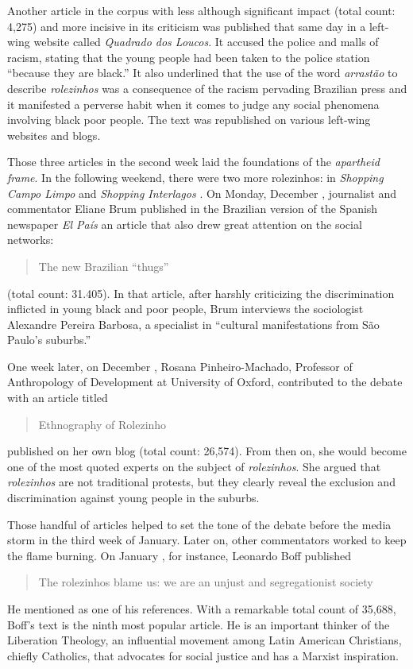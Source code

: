 Another article in the corpus \autocite{quadrado_loucos} with less although significant impact (total count: 4,275) and more incisive in its criticism was published that same day in a left-wing website called \emph{Quadrado dos Loucos}. It accused the police and malls of racism, stating that the young people had been taken to the police station \enquote{because they are black.} It also underlined that the use of the word \emph{arrastão} to describe \emph{rolezinhos} was a consequence of the racism pervading Brazilian press and it manifested a perverse habit when it comes to judge any social phenomena involving black poor people. The text was republished on various left-wing websites and blogs.

Those three articles in the second week laid the foundations of the \emph{apartheid frame}. In the following weekend, there were two more rolezinhos: in \emph{Shopping Campo Limpo} \autocite{folha_campo_limpo_1,folha_campo_limpo_2} and \emph{Shopping Interlagos} \autocite{folha_interlagos,g1_interlagos,ig_interlagos,r7_interlagos,estado_interlagos}. On Monday, December , journalist and commentator Eliane Brum published in the Brazilian version of the Spanish newspaper \emph{El País} an article that also drew great attention on the social networks: \blockcquote{brum_vandalos}{The new Brazilian \enquote{thugs}} (total count: 31.405). In that article, after harshly criticizing the discrimination inflicted in young black and poor people, Brum interviews the sociologist Alexandre Pereira Barbosa, a specialist in \enquote{cultural manifestations from São Paulo's suburbs.}

One week later, on December , Rosana Pinheiro-Machado, Professor of Anthropology of Development at University of Oxford, contributed to the debate with an article titled \blockcquote{rosana}{Ethnography of Rolezinho} published on her own blog (total count: 26,574). From then on, she would become one of the most quoted experts on the subject of \emph{rolezinhos}. She argued that \emph{rolezinhos} are not traditional protests, but they clearly reveal the exclusion and discrimination against young people in the suburbs.

Those handful of articles helped to set the tone of the debate before the media storm in the third week of January. Later on, other commentators worked to keep the flame burning. On January , for instance, Leonardo Boff published \blockcquote{boff_rolezinhos}[.]{The rolezinhos blame us: we are an unjust and segregationist society} He mentioned \citeauthor{rosana} as one of his references. With a remarkable total count of 35,688, Boff's text is the ninth most popular article. He is an important thinker of the Liberation Theology, an influential movement among Latin American Christians, chiefly Catholics, that advocates for social justice and has a Marxist inspiration.

